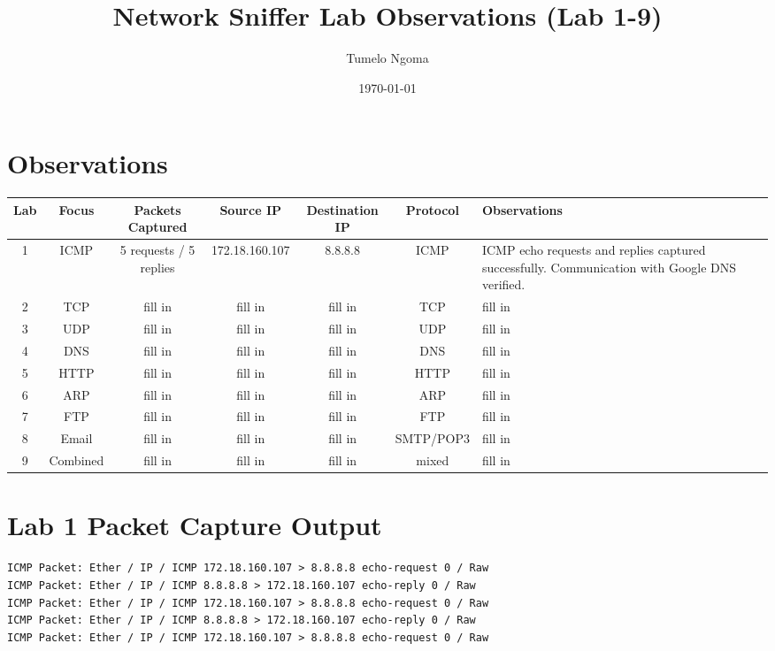 \documentclass[12pt]{article}
\title{Network Sniffer Lab Observations (Lab 1-9)}
\author{Tumelo Ngoma}
\date{\today}
\begin{document}
\maketitle

\section*{Observations}

\begin{longtable}{|c|c|c|c|c|c|p{5cm}|}
\hline
\textbf{Lab} & \textbf{Focus} & \textbf{Packets Captured} & \textbf{Source IP} & \textbf{Destination IP} & \textbf{Protocol} & \textbf{Observations} \\
\hline
1 & ICMP & 5 requests / 5 replies & 172.18.160.107 & 8.8.8.8 & ICMP & ICMP echo requests and replies captured successfully. Communication with Google DNS verified. \\
\hline
2 & TCP & fill in & fill in & fill in & TCP & fill in \\
\hline
3 & UDP & fill in & fill in & fill in & UDP & fill in \\
\hline
4 & DNS & fill in & fill in & fill in & DNS & fill in \\
\hline
5 & HTTP & fill in & fill in & fill in & HTTP & fill in \\
\hline
6 & ARP & fill in & fill in & fill in & ARP & fill in \\
\hline
7 & FTP & fill in & fill in & fill in & FTP & fill in \\
\hline
8 & Email & fill in & fill in & fill in & SMTP/POP3 & fill in \\
\hline
9 & Combined & fill in & fill in & fill in & mixed & fill in \\
\hline
\end{longtable}

\section*{Lab 1 Packet Capture Output}

\begin{lstlisting}[style=packets]
ICMP Packet: Ether / IP / ICMP 172.18.160.107 > 8.8.8.8 echo-request 0 / Raw
ICMP Packet: Ether / IP / ICMP 8.8.8.8 > 172.18.160.107 echo-reply 0 / Raw
ICMP Packet: Ether / IP / ICMP 172.18.160.107 > 8.8.8.8 echo-request 0 / Raw
ICMP Packet: Ether / IP / ICMP 8.8.8.8 > 172.18.160.107 echo-reply 0 / Raw
ICMP Packet: Ether / IP / ICMP 172.18.160.107 > 8.8.8.8 echo-request 0 / Raw
\end{lstlisting}
\end{document}
